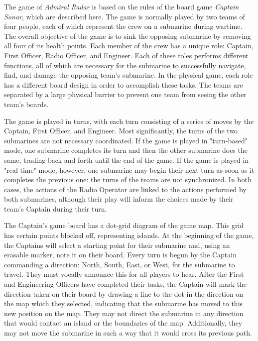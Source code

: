 The game of \textit{Admiral Radar} is based on the rules of the board game \textit{Captain Sonar}, which are described here. The game is normally played by two teams of four people, each of which represent the crew on a submarine during wartime. The overall objective of the game is to sink the opposing submarine by removing all four of its health points. Each member of the crew has a unique role: Captain, First Officer, Radio Officer, and Engineer. Each of these roles performs different functions, all of which are necessary for the submarine to successfully navigate, find, and damage the opposing team's submarine. In the physical game, each role has a different board design in order to accomplish these tasks. The teams are separated by a large physical barrier to prevent one team from seeing the other team's boards.

The game is played in turns, with each turn consisting of a series of moves by the Captain, First Officer, and Engineer. Most significantly, the turns of the two submarines are not necessary coordinated. If the game is played in "turn-based" mode, one submarine completes its turn and then the other submarine does the same, trading back and forth until the end of the game. If the game is played in "real time" mode, however, one submarine may begin their next turn as soon as it completes the previous one: the turns of the teams are not synchronized. In both cases, the actions of the Radio Operator are linked to the actions performed by both submarines, although their play will inform the choices made by their team's Captain during their turn. 

The Captain's game board has a dot-grid diagram of the game map. This grid has certain points blocked off, representing islands. At the beginning of the game, the Captains will select a starting point for their submarine and, using an erasable marker, note it on their board. Every turn is begun by the Captain commanding a direction: North, South, East, or West, for the submarine to travel. They must vocally announce this for all players to hear. After the First and Engineering Officers have completed their tasks, the Captain will mark the direction taken on their board by drawing a line to the dot in the direction on the map which they selected, indicating that the submarine has moved to this new position on the map. They may not direct the submarine in any direction that would contact an island or the boundaries of the map. Additionally, they may not move the submarine in such a way that it would cross its previous path.

